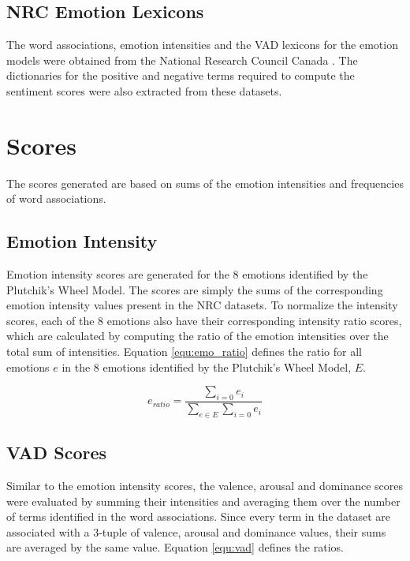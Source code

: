 \documentclass[11pt]{article}
\begin{document}
\subsection{NRC Emotion Lexicons}

The word associations, emotion intensities and the VAD lexicons for the emotion models were obtained from the National Research Council Canada \cite{LREC18-AIL,Mohammad13,vad-acl2018}. The dictionaries for the positive and negative terms required to compute the sentiment scores were also extracted from these datasets.

\section{Scores}

The scores generated are based on sums of the emotion intensities and frequencies of word associations.

\subsection{Emotion Intensity}

Emotion intensity scores are generated for the 8 emotions identified by the Plutchik's Wheel Model. The scores are simply the sums of the corresponding emotion intensity values present in the NRC datasets. To normalize the intensity scores, each of the 8 emotions also have their corresponding intensity ratio scores, which are calculated by computing the ratio of the emotion intensities over the total sum of intensities. Equation \ref{equ:emo_ratio} defines the ratio for all emotions $e$ in the 8 emotions identified by the Plutchik's Wheel Model, $E$.

\begin{equation} \label{equ:emo_ratio}
  e_{ratio} = \frac{\sum_{i=0}e_i}{\sum_{e \in E}\sum_{i=0}e_i}
\end{equation}

\subsection{VAD Scores}

Similar to the emotion intensity scores, the valence, arousal and dominance scores were evaluated by summing their intensities and averaging them over the number of terms identified in the word associations. Since every term in the dataset are associated with a 3-tuple of valence, arousal and dominance values, their sums are averaged by the same value. Equation \ref{equ:vad} defines the ratios.
\end{document}
